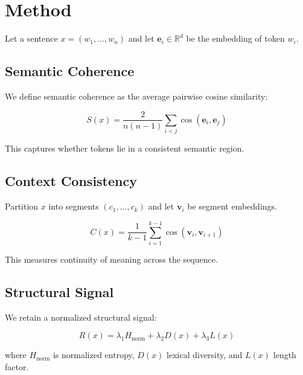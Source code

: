 \documentclass{article}
\theoremstyle{definition}
\begin{document}
\section{Method}

Let a sentence $x = (w_1, \dots, w_n)$ and let $\mathbf{e}_i \in \mathbb{R}^d$ be the embedding of token $w_i$.

\subsection{Semantic Coherence}
We define semantic coherence as the average pairwise cosine similarity:

\begin{equation}
S(x) = \frac{2}{n(n-1)} \sum_{i<j} \cos(\mathbf{e}_i, \mathbf{e}_j)
\end{equation}

This captures whether tokens lie in a consistent semantic region.

\subsection{Context Consistency}
Partition $x$ into segments $(c_1, \dots, c_k)$ and let $\mathbf{v}_i$ be segment embeddings.

\begin{equation}
C(x) = \frac{1}{k-1} \sum_{i=1}^{k-1} \cos(\mathbf{v}_i, \mathbf{v}_{i+1})
\end{equation}

This measures continuity of meaning across the sequence.

\subsection{Structural Signal}
We retain a normalized structural signal:

\begin{equation}
R(x) = \lambda_1 H_{\text{norm}} + \lambda_2 D(x) + \lambda_3 L(x)
\end{equation}

where $H_{\text{norm}}$ is normalized entropy, $D(x)$ lexical diversity, and $L(x)$ length factor.
\end{document}
